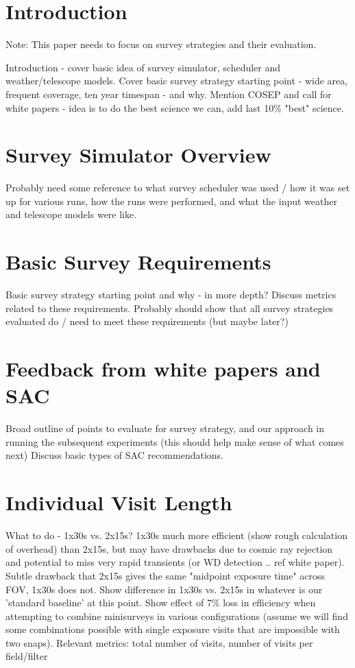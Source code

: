 \section{Introduction}

Note: This paper needs to focus on survey strategies and their evaluation. 

Introduction - cover basic idea of survey simulator, scheduler and weather/telescope models. 
Cover basic survey strategy starting point - wide area, frequent coverage, ten year timespan - and why. 
Mention COSEP and call for white papers - idea is to do the best science we can, add last 10\% "best" science. 


\section{Survey Simulator Overview}
Probably need some reference to what survey scheduler was used / how it was set up for various runs, how the runs were performed, and what the input weather and telescope models were like. 

\section{Basic Survey Requirements}
Basic survey strategy starting point and why - in more depth? Discuss metrics related to these requirements. 
Probably should show that all survey strategies evaluated do / need to meet these requirements (but maybe later?)

\section{Feedback from white papers and SAC} 
Broad outline of points to evaluate for survey strategy, and our approach in running the subsequent experiments (this should help make sense of what comes next)
Discuss basic types of SAC recommendations. 

\section{Individual Visit Length}
What to do - 1x30s vs. 2x15s? 1x30s much more efficient (show rough calculation of overhead) than 2x15s, but may have drawbacks due to cosmic ray rejection and potential to miss very rapid transients (or WD detection .. ref white paper). Subtle drawback that 2x15s gives the same "midpoint exposure time" across FOV, 1x30s does not. 
Show difference in 1x30s vs. 2x15s in whatever is our 'standard baseline' at this point. 
Show effect of 7\% loss in efficiency when attempting to combine minisurveys in various configurations (assume we will find some combinations possible with single exposure visits that are impossible with two snaps). 
Relevant metrics: total number of visits, number of visits per field/filter

